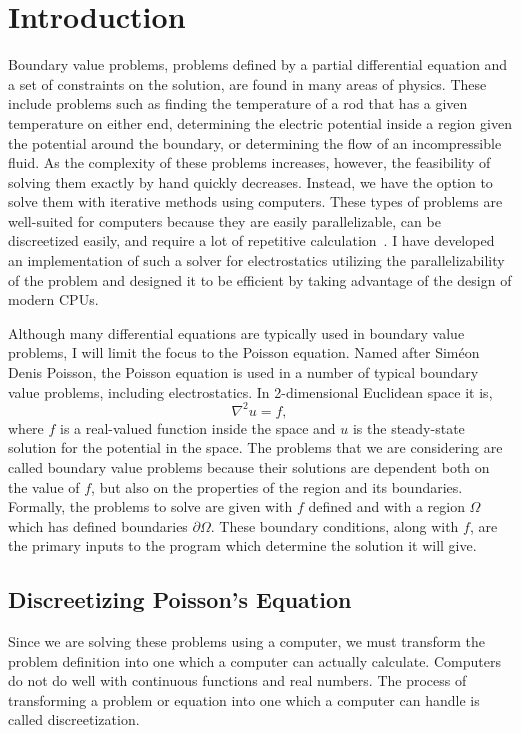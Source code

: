 \section{Introduction}

Boundary value problems, problems defined by a partial differential equation and a set of
constraints on the solution, are found in many areas of physics. These include problems
such as finding the temperature of a rod that has a given temperature on either end,
determining the electric potential inside a region given the potential around the
boundary, or determining the flow of an incompressible fluid. As the complexity of 
these problems increases, however, the feasibility of solving them exactly by hand
quickly decreases. Instead, we have the option to solve them with iterative methods
using computers. These types of problems are well-suited for computers because
they are easily parallelizable, can be discreetized easily, and require a lot of repetitive calculation~\cite{parallel}. I have developed an
implementation of such a solver for electrostatics utilizing the 
parallelizability of the problem and designed it to be efficient by taking advantage 
of the design of modern CPUs.

Although many differential equations are typically used in boundary value problems,
I will limit the focus to the Poisson equation. Named after Siméon Denis Poisson, the Poisson equation
is used in a number of typical boundary value problems, including electrostatics.
In 2-dimensional Euclidean space it is\cite{boas},
$$\nabla^2 u = f,$$
where $f$ is a real-valued function inside the space and $u$ is the steady-state
solution for the potential in the space. The problems that we are considering are called boundary value problems
because their solutions are dependent both on the value of $f$, but also on the properties of the region and its boundaries.
Formally, the problems to solve are given with $f$ defined and with a region $\Omega$ which has defined boundaries
$\partial\Omega$. These boundary conditions, along with $f$, are the primary inputs to the program which determine
the solution it will give.

\subsection{Discreetizing Poisson's Equation}

Since we are solving these problems using a computer, we must transform the problem definition into one which a computer
can actually calculate. Computers do not do well with continuous functions and real numbers. The process of transforming
a problem or equation into one which a computer can handle is called discreetization.

